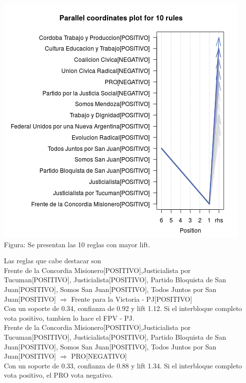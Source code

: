 \documentclass{endm}
\begin{document}
\begin{center}
\includegraphics[scale=0.4]{graficos/paracoordArgFedRestoPartidos.png} \\
\scriptsize{Figura: Se presentan las 10 reglas con mayor lift.} \\
\end{center} 

Las reglas que cabe destacar son \\

{Frente de la Concordia Misionero[POSITIVO],Justicialista por Tucuman[POSITIVO], Justicialista[POSITIVO], Partido Bloquista de San Juan[POSITIVO], Somos San Juan[POSITIVO], Todos Juntos por San Juan[POSITIVO]} $\Longrightarrow$ {Frente para la Victoria - PJ[POSITIVO]} \\

Con un soporte de 0.34, confianza de  0.92 y lift 1.12. Si el interbloque completo vota positivo, tambien lo hace el FPV - PJ. \\

{Frente de la Concordia Misionero[POSITIVO],Justicialista por Tucuman[POSITIVO], Justicialista[POSITIVO], Partido Bloquista de San Juan[POSITIVO], Somos San Juan[POSITIVO], Todos Juntos por San Juan[POSITIVO]} $\Longrightarrow$ {PRO[NEGATIVO]} \\

Con un soporte de 0.33, confianza de  0.88 y lift 1.34. Si el interbloque completo vota positivo, el PRO vota negativo. \\
\end{document}
